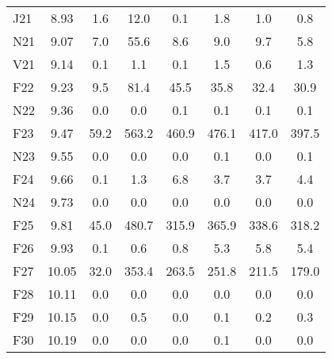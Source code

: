 \documentclass[article,crop=false]{standalone}%
\begin{document}
\begin{tabular}[h]{l c c c c c c c}
\rowcolor{white}%
J21&8.93&1.6&12.0&0.1&1.8&1.0&0.8\\%
\rowcolor{lightgray}%
N21&9.07&7.0&55.6&8.6&9.0&9.7&5.8\\%
\rowcolor{white}%
V21&9.14&0.1&1.1&0.1&1.5&0.6&1.3\\%
\rowcolor{lightgray}%
F22&9.23&9.5&81.4&45.5&35.8&32.4&30.9\\%
\rowcolor{white}%
N22&9.36&0.0&0.0&0.1&0.1&0.1&0.1\\%
\rowcolor{lightgray}%
F23&9.47&59.2&563.2&460.9&476.1&417.0&397.5\\%
\rowcolor{white}%
N23&9.55&0.0&0.0&0.0&0.1&0.0&0.1\\%
\rowcolor{lightgray}%
F24&9.66&0.1&1.3&6.8&3.7&3.7&4.4\\%
\rowcolor{white}%
N24&9.73&0.0&0.0&0.0&0.0&0.0&0.0\\%
\rowcolor{lightgray}%
F25&9.81&45.0&480.7&315.9&365.9&338.6&318.2\\%
\rowcolor{white}%
F26&9.93&0.1&0.6&0.8&5.3&5.8&5.4\\%
\rowcolor{lightgray}%
F27&10.05&32.0&353.4&263.5&251.8&211.5&179.0\\%
\rowcolor{white}%
F28&10.11&0.0&0.0&0.0&0.0&0.0&0.0\\%
\rowcolor{lightgray}%
F29&10.15&0.0&0.5&0.0&0.1&0.2&0.3\\%
\rowcolor{white}%
F30&10.19&0.0&0.0&0.0&0.1&0.0&0.0\\%
\hline%
\end{tabular}%
\end{document}
